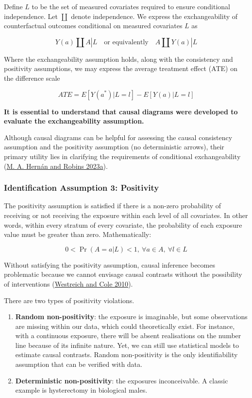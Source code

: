 \documentclass[
  singlecolumn]{article}
\begin{document}
Define \(L\) to be the set of measured covariates required to ensure
conditional independence. Let \(\coprod\) denote independence. We
express the exchangeability of counterfactual outcomes conditional on
measured covariates \(L\) as

\[
Y(a) \coprod  A|L \quad \text{or equivalently} \quad A \coprod  Y(a)|L
\]

Where the exchangeability assumption holds, along with the consistency
and positivity assumptions, we may express the average treatment effect
(ATE) on the difference scale

\[
ATE = E[Y(a^*)|L = l] - E[Y(a)|L = l]
\]

\textbf{It is essential to understand that causal diagrams were
developed to evaluate the exchangeability assumption.}

Although causal diagrams can be helpful for assessing the causal
consistency assumption and the positivity assumption (no deterministic
arrows), their primary utility lies in clarifying the requirements of
conditional exchangeability (\protect\hyperlink{ref-hernuxe1n2023}{M. A.
Hernán and Robins 2023a}).

\hypertarget{identification-assumption-3-positivity}{%
\subsubsection{Identification Assumption 3:
Positivity}\label{identification-assumption-3-positivity}}

The positivity assumption is satisfied if there is a non-zero
probability of receiving or not receiving the exposure within each level
of all covariates. In other words, within every stratum of every
covariate, the probability of each exposure value must be greater than
zero. Mathematically:

\[
0 < \Pr(A=a|L)<1, ~ \forall a \in A, ~ \forall l \in L
\]

Without satisfying the positivity assumption, causal inference becomes
problematic because we cannot envisage causal contrasts without the
possibility of interventions
(\protect\hyperlink{ref-westreich2010}{Westreich and Cole 2010}).

There are two types of positivity violations.

\begin{enumerate}
\def\labelenumi{\arabic{enumi}.}
\item
  \textbf{Random non-positivity}: the exposure is imaginable, but some
  observations are missing within our data, which could theoretically
  exist. For instance, with a continuous exposure, there will be absent
  realisations on the number line because of its infinite nature. Yet,
  we can still use statistical models to estimate causal contrasts.
  Random non-positivity is the only identifiability assumption that can
  be verified with data.
\item
  \textbf{Deterministic non-positivity}: the exposures inconceivable. A
  classic example is hysterectomy in biological males.
\end{enumerate}
\end{document}
